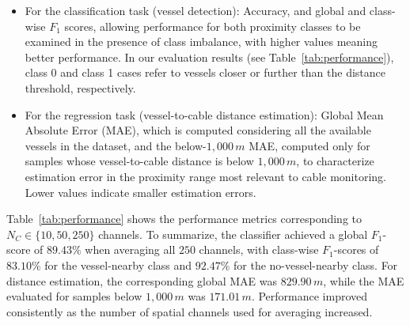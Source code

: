 \documentclass[11pt]{article}
\begin{document}
\begin{itemize}
  \item For the classification task (vessel detection): Accuracy, and global and class-wise $F_1$ scores, allowing performance for both proximity classes to be examined in the presence of class imbalance, with higher values meaning better performance. In our evaluation results (see Table~\ref{tab:performance}), class 0 and class 1 cases refer to vessels closer or further than the distance threshold, respectively. %
  \item For the regression task (vessel-to-cable distance estimation): Global Mean Absolute Error (MAE), which is computed considering all the available vessels in the dataset, and the below-$1{,}000\,m$ MAE, computed only for samples whose vessel-to-cable distance is below $1{,}000\,m$, to characterize estimation error in the proximity range most relevant to cable monitoring. Lower values indicate smaller estimation errors.
\end{itemize}

Table~\ref{tab:performance} shows the performance metrics corresponding to $N_C \in \lbrace 10, 50, 250 \rbrace$ channels. To summarize, the classifier achieved a global $F_1$-score of $89.43\%$ when averaging all $250$ channels, with class-wise $F_1$-scores of $83.10\%$ for the vessel-nearby class and $92.47\%$ for the no-vessel-nearby class. For distance estimation, the corresponding global MAE was $829.90\,m$, while the MAE evaluated for samples below $1,000\,m$ was $171.01\,m$. Performance improved consistently as the number of spatial channels used for averaging increased.
\end{document}
